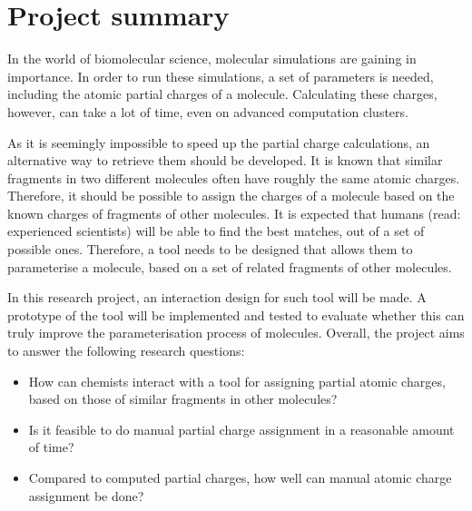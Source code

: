 \chapter{Project summary}

In the world of biomolecular science, molecular simulations are gaining in importance. In order to run these simulations, a set of parameters is needed, including the atomic partial charges of a molecule. Calculating these charges, however, can take a lot of time, even on advanced computation clusters.

As it is seemingly impossible to speed up the partial charge calculations, an alternative way to retrieve them should be developed. It is known that similar fragments in two different molecules often have roughly the same atomic charges. Therefore, it should be possible to assign the charges of a molecule based on the known charges of fragments of other molecules. It is expected that humans (read: experienced scientists) will be able to find the best matches, out of a set of possible ones. Therefore, a tool needs to be designed that allows them to parameterise a molecule, based on a set of related fragments of other molecules. 

In this research project, an interaction design for such tool will be made. A prototype of the tool will be implemented and tested to evaluate whether this can truly improve the parameterisation process of molecules. Overall, the project aims to answer the following research questions:
\begin{itemize}
\item How can chemists interact with a tool for assigning partial atomic charges, based on those of similar fragments in other molecules?
\item Is it feasible to do manual partial charge assignment in a reasonable amount of time?
\item Compared to computed partial charges, how well can manual atomic charge assignment be done?
\end{itemize}
